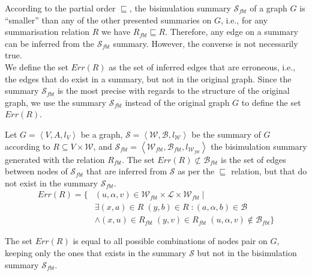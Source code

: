 According to the partial order $\sqsubseteq$, the bisimulation summary $\mathcal{S}_{fbt}$ of a graph $G$ is ``smaller'' than any of the other presented summaries on $G$, i.e., for any summarisation relation $R$ we have $R_{fbt} \sqsubseteq R$. Therefore, any edge on a summary can be inferred from the $\mathcal{S}_{fbt}$ summary. However, the converse is not necessarily true.\\

We define the set $Err(R)$ as the set of inferred edges that are erroneous, i.e., the edges that do exist in a summary, but not in the original graph. Since the summary $\mathcal{S}_{fbt}$ is the most precise with regards to the structure of the original graph, we use the summary $\mathcal{S}_{fbt}$ instead of the original graph $G$ to define the set $Err(R)$.

\begin{definition}
Let $G=\left\langle V, A, l_V \right\rangle$ be a graph, $\mathcal{S} = \left\langle \mathcal{W}, \mathcal{B}, l_{\mathcal{W}} \right\rangle$ be the summary of $G$ according to $R \subseteq V \times \mathcal{W}$, and $\mathcal{S}_{fbt} = \left\langle \mathcal{W}_{fbt}, \mathcal{B}_{fbt}, l_{\mathcal{W}_{fbt}} \right\rangle$ the bisimulation summary generated with the relation $R_{fbt}$.
The set $Err(R) \not \subset \mathcal{B}_{fbt}$ is the set of edges between nodes of $\mathcal{S}_{fbt}$ that are inferred from $\mathcal{S}$ as per the $\sqsubseteq$ relation, but that do not exist in the summary $\mathcal{S}_{fbt}$.
\begin{equation*}
\begin{split}
Err(R) = \{ & (u, \alpha, v) \in \mathcal{W}_{fbt} \times \mathcal{L} \times \mathcal{W}_{fbt} \mid \\
 & \exists (x,a) \in R\; (y,b) \in R\;: (a, \alpha, b) \in \mathcal{B} \\
 & \wedge (x, u) \in R_{fbt}\; (y, v) \in R_{fbt}\; (u, \alpha, v) \not \in \mathcal{B}_{fbt} \}
\end{split}
\end{equation*}
\end{definition}

\begin{remark}
The set $Err(R)$ is equal to all possible combinations of nodes pair on $G$, keeping only the ones that exists in the summary $\mathcal{S}$ but not in the bisimulation summary $\mathcal{S}_{fbt}$.
\end{remark}

